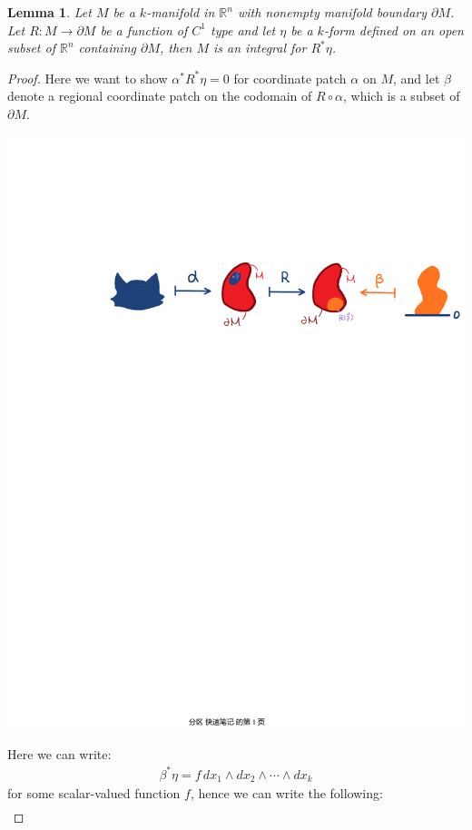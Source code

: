 \documentclass[11pt,oneside]{book}
\theoremstyle{break}
\theoremstyle{break}
\newtheorem{lem}{Lemma}[thm]
\newcommand{\R}{\mathbb{R}}
\begin{document}
\begin{lem}
Let $M$ be a $k$-manifold in $\R^n$ with nonempty manifold boundary $\partial M$. Let $R:M \to \partial M$ be a function of $C^1$ type and let $\eta$ be a $k$-form defined on an open subset of $\R^n$ containing $\partial M$, then $M$ is an integral for $R^*\eta$. 
\end{lem}
\begin{proof}
Here we want to show $\alpha^*R^*\eta = 0$ for coordinate patch $\alpha$ on $M$, and let $\beta$ denote a regional coordinate patch on the codomain of $R\circ \alpha$, which is a subset of $\partial M$. 
\begin{center}
\includegraphics[scale=0.8]{retraction.pdf}
\end{center}
Here we can write:
\begin{align*}
\beta^*\eta = f\, dx_1 \wedge dx_2 \wedge \cdots \wedge dx_k
\end{align*}
for some scalar-valued function $f$, hence we can write the following:
\begin{align*}

\end{align*}
\end{proof}
\end{document}
